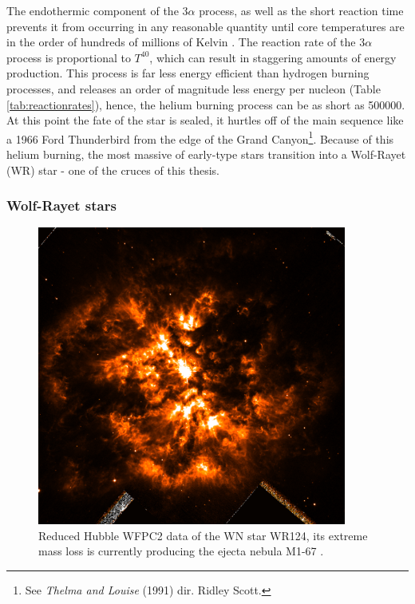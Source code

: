 \noindent
The endothermic component of the 3$\alpha$ process, as well as the short reaction time prevents it from occurring in any reasonable quantity until core temperatures are in the order of hundreds of millions of Kelvin
\parencite[Pt.~6]{kippenhahnStellarStructureEvolution2012}.
The reaction rate of the 3$\alpha$ process is proportional to $T^{40}$, which can result in staggering amounts of energy production.
This process is far less energy efficient than hydrogen burning processes, and releases an order of magnitude less energy per nucleon (Table \ref{tab:reactionrates}), hence, the helium burning process can be as short as \SI{500000}{\year}.
At this point the fate of the star is sealed, it hurtles off of the main sequence like a 1966 Ford Thunderbird from the edge of the Grand Canyon\footnote{See \emph{Thelma and Louise} (1991) dir. Ridley Scott.}.
Because of this helium burning, the most massive of early-type stars transition into a Wolf-Rayet (WR) star - one of the cruces of this thesis.

\subsubsection{Wolf-Rayet stars}
\label{sec:wrtype}

\begin{figure}[ht]
  \centering
  \includegraphics[width=4in]{assets/WR124.png}
  \caption[\textit{M1-67 nebula around WR124 \parencite{2010ApJ...724L..90M}}]{Reduced Hubble WFPC2 data of the WN star WR124, its extreme mass loss is currently producing the ejecta nebula M1-67 \parencite{2010ApJ...724L..90M}.}
  \label{fig:wr124}
\end{figure}

